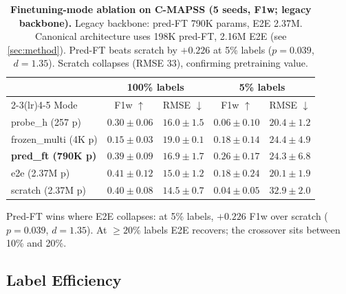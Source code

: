 \documentclass{article}
\begin{document}
\begin{table}[t]
  \centering
  \caption{\textbf{Finetuning-mode ablation on C-MAPSS (5 seeds, F1w; legacy backbone).} Legacy backbone: pred-FT 790K params, E2E 2.37M. Canonical architecture uses 198K pred-FT, 2.16M E2E (see \cref{sec:method}). Pred-FT beats scratch by $+0.226$ at 5\% labels ($p{=}0.039$, $d{=}1.35$). Scratch collapses (RMSE $33$), confirming pretraining value.}
  \label{tab:finetune_ablation}
  \small
  \begin{tabular}{lcccc}
    \toprule
                               & \multicolumn{2}{c}{\textbf{100\% labels}} & \multicolumn{2}{c}{\textbf{5\% labels}}                                                      \\
    \cmidrule(lr){2-3}\cmidrule(lr){4-5}
    Mode                       & F1w $\uparrow$                            & RMSE $\downarrow$                       & F1w $\uparrow$           & RMSE $\downarrow$       \\
    \midrule
    probe\_h (257 p)           & $0.30 \pm 0.06$                           & $16.0 \pm 1.5$                          & $0.06 \pm 0.10$          & $20.4 \pm 1.2$          \\
    frozen\_multi (4K p)       & $0.15 \pm 0.03$                           & $19.0 \pm 0.1$                          & $0.18 \pm 0.14$          & $24.4 \pm 4.9$          \\
    \textbf{pred\_ft (790K p)} & $0.39 \pm 0.09$                           & $16.9 \pm 1.7$                          & $\mathbf{0.26 \pm 0.17}$ & $24.3 \pm 6.8$          \\
    e2e (2.37M p)              & $0.41 \pm 0.12$                           & $15.0 \pm 1.2$                          & $0.18 \pm 0.24$          & $\mathbf{20.1 \pm 1.9}$ \\
    scratch (2.37M p)          & $0.40 \pm 0.08$                           & $14.5 \pm 0.7$                          & $0.04 \pm 0.05$          & $32.9 \pm 2.0$          \\
    \bottomrule
  \end{tabular}
\end{table}

Pred-FT wins where E2E collapses: at 5\% labels, $+0.226$ F1w over scratch ($p{=}0.039$, $d{=}1.35$). At ${\geq}20\%$ labels E2E recovers; the crossover sits between 10\% and 20\%.

\subsection{Label Efficiency}
\label{sec:label_efficiency}
\end{document}
